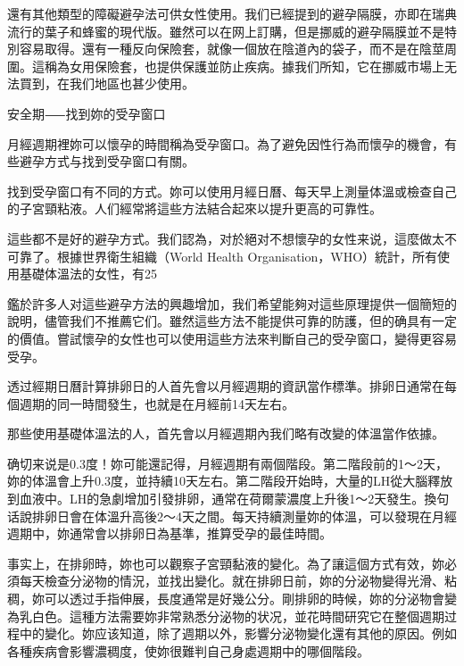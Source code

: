 \documentclass[12pt,UTF8]{ctexbook}
\begin{document}
還有其他類型的障礙避孕法可供女性使用。我们已經提到的避孕隔膜，亦即在瑞典流行的葉子和蜂蜜的現代版。雖然可以在网上訂購，但是挪威的避孕隔膜並不是特別容易取得。還有一種反向保險套，就像一個放在陰道內的袋子，而不是在陰莖周圍。這稱為女用保險套，也提供保護並防止疾病。據我们所知，它在挪威市場上无法買到，在我们地區也甚少使用。





安全期⸺找到妳的受孕窗口





月經週期裡妳可以懷孕的時間稱為受孕窗口。為了避免因性行為而懷孕的機會，有些避孕方式与找到受孕窗口有關。

找到受孕窗口有不同的方式。妳可以使用月經日曆、每天早上測量体溫或檢查自己的子宮頸粘液。人们經常將這些方法結合起來以提升更高的可靠性。

這些都不是好的避孕方式。我们認為，对於絕对不想懷孕的女性来说，這麼做太不可靠了。根據世界衛生組織（World Health Organisation，WHO）統計，所有使用基礎体溫法的女性，有25%

鑑於許多人对這些避孕方法的興趣增加，我们希望能夠对這些原理提供一個簡短的說明，儘管我们不推薦它们。雖然這些方法不能提供可靠的防護，但的确具有一定的價值。嘗試懷孕的女性也可以使用這些方法來判斷自己的受孕窗口，變得更容易受孕。

透过經期日曆計算排卵日的人首先會以月經週期的資訊當作標準。排卵日通常在每個週期的同一時間發生，也就是在月經前14天左右。

那些使用基礎体溫法的人，首先會以月經週期內我们略有改變的体溫當作依據。

确切来说是0.3度！妳可能還記得，月經週期有兩個階段。第二階段前的1〜2天，妳的体溫會上升0.3度，並持續10天左右。第二階段开始時，大量的LH從大腦釋放到血液中。LH的急劇增加引發排卵，通常在荷爾蒙濃度上升後1〜2天發生。換句话說排卵日會在体溫升高後2〜4天之間。每天持續測量妳的体溫，可以發現在月經週期中，妳通常會以排卵日為基準，推算受孕的最佳時間。

事实上，在排卵時，妳也可以觀察子宮頸黏液的變化。為了讓這個方式有效，妳必須每天檢查分泌物的情況，並找出變化。就在排卵日前，妳的分泌物變得光滑、粘稠，妳可以透过手指伸展，長度通常是好幾公分。剛排卵的時候，妳的分泌物會變為乳白色。這種方法需要妳非常熟悉分泌物的状况，並花時間研究它在整個週期过程中的變化。妳应该知道，除了週期以外，影響分泌物變化還有其他的原因。例如各種疾病會影響濃稠度，使妳很難判自己身處週期中的哪個階段。
\end{document}
